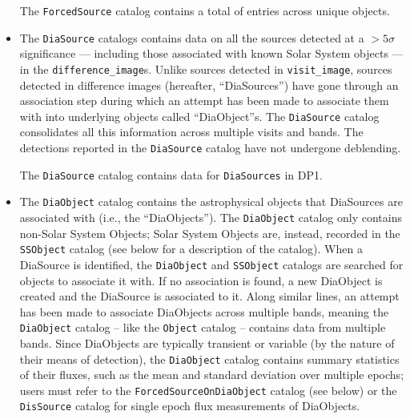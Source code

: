 \begin{itemize}
The \texttt{ForcedSource} catalog contains a total of \nforcedsources entries across \nforcedobjects unique objects.


\item The \texttt{DiaSource} catalogs contains data on all the sources detected at a $>5\sigma$ significance --- including those associated with known Solar System objects --- in the \texttt{difference\_image}s.
Unlike sources detected in \texttt{visit\_image}, sources detected in difference images (hereafter, ``DiaSources'') have gone through an association step during which an attempt has been made to associate them with into underlying objects called ``DiaObject''s. The \texttt{DiaSource} catalog consolidates all this information across multiple visits and bands. The detections reported in the \texttt{DiaSource} catalog have not undergone deblending.

The \texttt{DiaSource} catalog contains data for \ndiasources \texttt{DiaSources} in \gls{DP1}.


\item The \texttt{DiaObject} catalog contains the astrophysical objects that DiaSources are associated with (i.e., the ``DiaObjects'').
The \texttt{DiaObject} catalog only contains non-Solar System Objects; Solar System Objects are, instead, recorded in the \texttt{SSObject} catalog (see below for a description of the  catalog).
When a DiaSource is identified, the \texttt{DiaObject} and \texttt{SSObject} catalogs are searched for objects to associate it with.
If no association is found, a new DiaObject is created and the DiaSource is associated to it.
Along similar lines, an attempt has been made to associate DiaObjects across multiple bands, meaning the \texttt{DiaObject} catalog -- like the \texttt{Object} catalog -- contains data from multiple bands.
Since DiaObjects are typically \gls{transient} or variable (by the nature of their means of detection), the \texttt{DiaObject} catalog contains summary statistics of their fluxes, such as the mean and standard deviation over multiple epochs; users must refer to the \texttt{ForcedSourceOnDiaObject} catalog (see below) or the \texttt{DisSource} catalog for single \gls{epoch} \gls{flux} measurements of DiaObjects.


\end{itemize}

